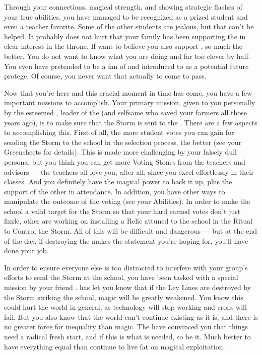 \documentclass[char]{GL2020}
\begin{document}
Through your connections, magical strength, and showing strategic flashes of your true abilities, you have managed to be recognized as a prized student and even a teacher favorite. 
Some of the other students are jealous, but that can't be helped. It probably does not hurt that your family has been supporting the \cPrince{\intro} in \cPrince{\their} clear interest in the throne. If \cPrince{\they} want\cPrince{\verbs} to believe you also support \cPrince{\them}, so much the better. You do not want \cPrince{} to know what you are doing and \cPrince{\theyare} far too clever by half. You even have pretended to be a fan of \cPrince{} and introduced \cAmbition{} to \cPrince{\them} as a potential future protege. Of course, you never want that actually to come to pass.
 
Now that you're here and this crucial moment in time has come, you have a few important missions to accomplish. Your primary mission, given to you personally by the esteemed \cChupLeader{\intro}, leader of the \pGoaties{} (and selfsame \cChupLeader{\person} who saved your farmers all those years ago), is to make sure that the Storm is sent to the \pSc{}. There are a few aspects to accomplishing this. First of all, the more student votes you can gain for sending the Storm to the school in the selection process, the better (see your Greensheets for details). This is made more challenging by your falsely dull persona, but you think you can get more Voting Stones from the teachers and advisors — the teachers all love you, after all, since you excel effortlessly in their classes. And you definitely have the magical power to back it up, plus the support of the other \pGoaties{} in attendance. In addition, you have other ways to manipulate the outcome of the voting (see your Abilities). In order to make the school a valid target for the Storm so that your hard earned votes don't just fizzle, other \pGoaties{} are working on installing a Relic attuned to the school in the Ritual to Control the Storm. All of this will be difficult and dangerous — but at the end of the day, if destroying the \pSchool{} makes the statement you're hoping for, you'll have done your job.
 
In order to ensure everyone else is too distracted to interfere with your group's efforts to send the Storm at the school, you have been tasked with a special mission by your friend \cChupSecond{}. \cChupLeader{} has let you know that if the Ley Lines are destroyed by the Storm striking the school, magic will be greatly weakened. You know this could hurt the world in general, as technology will stop working and crops will fail. But you also know that the world can’t continue existing as it is, and there is no greater force for inequality than magic. The \pGoaties{} have convinced you that things need a radical fresh start, and if this is what is needed, so be it. Much better to have everything equal than continue to live fat on magical exploitation. 
\end{document}

